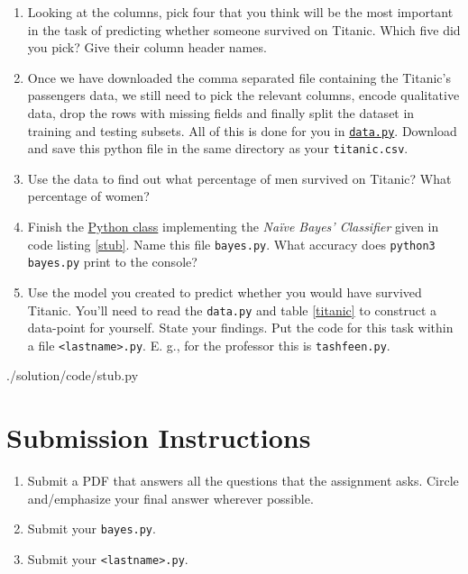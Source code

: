 \documentclass{homework}
\begin{document}
\begin{enumerate}
  \item Looking at the columns, pick four that you think will be the most important in the task of predicting whether someone survived on Titanic. Which five did you pick? Give their column header names.
  \item Once we have downloaded the comma separated file containing the Titanic's passengers data, we still need to pick the relevant columns, encode qualitative data, drop the rows with missing fields and finally split the dataset in training and testing subsets. All of this is done for you in \href{https://tashfeen.org/raw/share/dsf/data.py}{\texttt{data.py}}. Download and save this python file in the same directory as your \texttt{titanic.csv}.
  \item Use the data to find out what percentage of men survived on Titanic? What percentage of women?
  \item Finish the \href{https://tashfeen.org/raw/share/dsf/stub.py}{Python class} implementing the \textit{Na\"ive Bayes' Classifier} given in code listing \ref{stub}. Name this file \texttt{bayes.py}. What accuracy does \texttt{python3 bayes.py} print to the console?
  \item Use the model you created to predict whether you would have survived Titanic. You'll need to read the \texttt{data.py} and table \ref{titanic} to construct a data-point for yourself. State your findings. Put the code for this task within a file \texttt{<lastname>.py}. E. g., for the professor this is \texttt{tashfeen.py}.
\end{enumerate}


{./solution/code/stub.py}

\section*{Submission Instructions}

\begin{enumerate}
    \item Submit a PDF that answers all the questions that the assignment asks. Circle and/emphasize your final answer wherever possible.
    \item Submit your \texttt{bayes.py}.
    \item Submit your \texttt{<lastname>.py}.
\end{enumerate}
\end{document}
